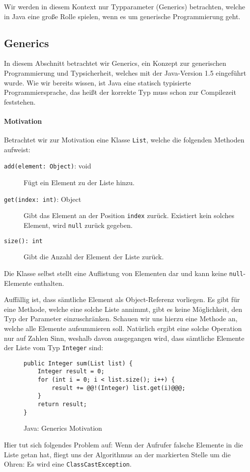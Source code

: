 
Wir werden in diesem Kontext nur Typparameter (Generics) betrachten, welche in Java eine große Rolle spielen, wenn es um generische Programmierung geht.

\subsection{Generics}
	\label{sec:generics}

	In diesem Abschnitt betrachtet wir Generics, ein Konzept zur generischen Programmierung und Typsicherheit, welches mit der Java-Version 1.5 eingeführt wurde. Wie wir bereits wissen, ist Java eine statisch typisierte Programmiersprache, das heißt der korrekte Typ muss schon zur Compilezeit feststehen.
	
	\paragraph{Motivation}
		Betrachtet wir zur Motivation eine Klasse \texttt{List}, welche die folgenden Methoden aufweist:
		\begin{description}
			\item[\texttt{add(element: Object)}: void] Fügt ein Element zu der Liste hinzu.
			\item[\texttt{get(index: int)}: Object] Gibt das Element an der Position \texttt{index} zurück. Existiert kein solches Element, wird \texttt{null} zurück gegeben.
			\item[\texttt{size(): int}] Gibt die Anzahl der Element der Liste zurück.
		\end{description}
		Die Klasse selbst stellt eine Auflistung von Elementen dar und kann keine \texttt{null}-Elemente enthalten.
		
		Auffällig ist, dass sämtliche Element als Object-Referenz vorliegen. Es gibt für eine Methode, welche eine solche Liste annimmt, gibt es keine Möglichkeit, den Typ der Parameter einzuschränken. Schauen wir uns hierzu eine Methode an, welche alle Elemente aufsummieren soll. Natürlich ergibt eine solche Operation nur auf Zahlen Sinn, weshalb davon ausgegangen wird, dass sämtliche Elemente der Liste vom Typ \texttt{Integer} sind:
		\begin{figure}[H]
			\centering
			\begin{lstlisting}
public Integer sum(List list) {
	Integer result = 0;
	for (int i = 0; i < list.size(); i++) {
		result += @@!(Integer) list.get(i)@@@;
	}
	return result;
}
			\end{lstlisting}
			\caption{Java: Generics Motivation}
			\label{fig:generics_motivation}
		\end{figure}
		Hier tut sich folgendes Problem auf: Wenn der Aufrufer falsche Elemente in die Liste getan hat, fliegt uns der Algorithmus an der markierten Stelle um die Ohren: Es wird eine \texttt{ClassCastException}.
		
